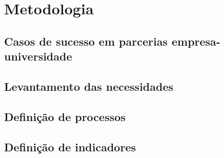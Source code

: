 \chapter[Metodologia]{Metodologia}
\label{chap:metodologia}

\section{Casos de sucesso em parcerias empresa-universidade} %
\label{sec:cases}


\section{Levantamento das necessidades} %
\label{sec:necessidades}


\section{Definição de processos} %
\label{sec:processos}


\section{Definição de indicadores} %
\label{sec:indicadores}